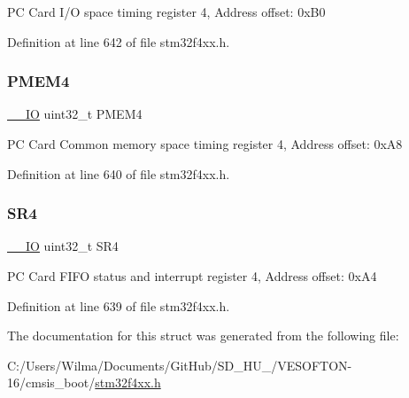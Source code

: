 PC Card I/O space timing register 4, Address offset\+: 0x\+B0 

Definition at line 642 of file stm32f4xx.\+h.

\mbox{\label{struct_f_s_m_c___bank4___type_def_a3f82cc749845fb0dd7dfa8121d96b663}} 
\subsubsection{\texorpdfstring{P\+M\+E\+M4}{PMEM4}}
{\footnotesize\ttfamily \hyperlink{group___c_m_s_i_s__core__definitions_gaec43007d9998a0a0e01faede4133d6be}{\+\_\+\+\_\+\+IO} uint32\+\_\+t P\+M\+E\+M4}

PC Card Common memory space timing register 4, Address offset\+: 0x\+A8 

Definition at line 640 of file stm32f4xx.\+h.

\mbox{\label{struct_f_s_m_c___bank4___type_def_a8218d6e11dae5d4468c69303dec0b4fc}} 
\subsubsection{\texorpdfstring{S\+R4}{SR4}}
{\footnotesize\ttfamily \hyperlink{group___c_m_s_i_s__core__definitions_gaec43007d9998a0a0e01faede4133d6be}{\+\_\+\+\_\+\+IO} uint32\+\_\+t S\+R4}

PC Card F\+I\+FO status and interrupt register 4, Address offset\+: 0x\+A4 

Definition at line 639 of file stm32f4xx.\+h.



The documentation for this struct was generated from the following file\+:\begin{DoxyCompactItemize}
\item 
C\+:/\+Users/\+Wilma/\+Documents/\+Git\+Hub/\+S\+D\+\_\+\+H\+U\+\_/\+V\+E\+S\+O\+F\+T\+O\+N-\/16/cmsis\+\_\+boot/\hyperlink{stm32f4xx_8h}{stm32f4xx.\+h}\end{DoxyCompactItemize}

